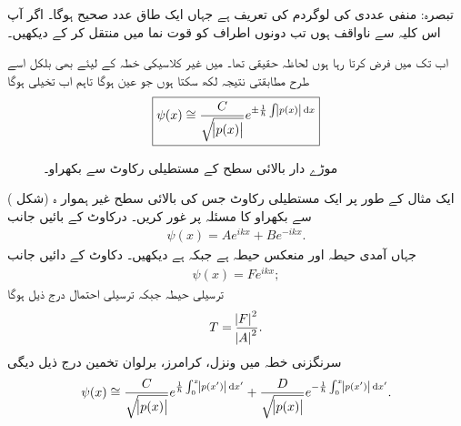 تبصرہ: منفی عددی کی لوگردم کی تعریف  ہے جہاں  ایک طاق عدد صحیح ہوگا۔ اگر آپ اس کلیہ سے ناواقف ہوں تب دونوں اطراف کو قوت نما میں منتقل کر کے دیکھیں۔

اب تک میں  فرض کرتا رہا ہوں لحاظہ  حقیقی تھا۔ میں غیر کلاسیکی خطہ  کے لیئے بھی بلکل اسے طرح مطابقتی نتیجہ لکھ سکتا ہوں جو عین  ہوگا تاہم اب  تخیلی ہوگا
\begin{align}
	\boxed{\psi(x)\cong\frac{C}{\sqrt{\abs{p(x)}}}e^{\pm \frac{1}{\hslash}\int\abs{p(x)}\dif x}}
\end{align}

\begin{figure}
\centering
{}
\caption{موڑے دار بالائی سطح کے   مستطیلی رکاوٹ سے بکھراو۔}
\label{شکل_وکب_مستطیلی_رکاوٹ}
\end{figure}

ایک مثال کے طور پر ایک مستطیلی رکاوٹ جس کی بالائی سطح غیر ہموار ہ (شکل ) سے بکھراو کا مسئلہ پر غور کریں۔ درکاوٹ کے بائیں جانب  
\begin{align}
	\psi(x)=Ae^{ikx}+Be^{-ikx}.
\end{align}
جہاں  آمدی حیطہ اور  منعکس حیطہ ہے جبکہ  ہے  دیکھیں۔ دکاوٹ کے دائیں جانب 
\begin{align}
	\psi(x)=Fe^{ikx};
\end{align}
 ترسیلی حیطہ جبکہ ترسیلی احتمال درج ذیل ہوگا
\begin{align}
	T=\frac{\abs{F}^{2}}{\abs{A}^{2}}.
\end{align}
سرنگزنی خطہ  میں ونزل، کرامرز، برلوان تخمین درج ذیل دیگی
\begin{align}
	\psi(x)\cong\frac{C}{\sqrt{\abs{p(x)}}}e^{\frac{1}{\hslash}\int^{x}_{0}\abs{p(x')}\dif x'}+\frac{D}{\sqrt{\abs{p(x)}}}e^{-\frac{1}{\hslash}\int^{x}_{0}\abs{p(x')}\dif x'}.
\end{align}

